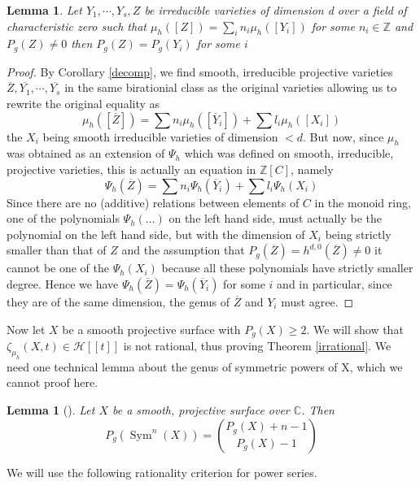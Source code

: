 \documentclass[11pt, a4paper, german]{article}
\theoremstyle{plain}
\newtheorem{lemma}[theorem]{Lemma}
\theoremstyle{definition}
\DeclareMathOperator{\Sym}{Sym}
\begin{document}
\begin{lemma}
    \label{same}
    Let $Y_1,\cdots,Y_s,Z$ be irreducible varieties of dimension d over a field of characteristic zero 
    such that $\mu_h([Z]) = \sum_i n_i \mu_h([Y_i])$ for some $n_i \in \mathbb{Z}$ and $P_g(Z) \neq 0$ then $P_g(Z) = P_g(Y_i)$ for some $i$
\end{lemma}
\begin{proof}
    By Corollary \ref{decomp}, we find smooth, irreducible projective varieties $\overline{Z},\overline{Y_1},\cdots, \overline{Y_s}$ in the same
    birationial class as the original varieties allowing us to rewrite the original equality as 
    \[
        \mu_h([\overline{Z}]) = \sum n_i\mu_h([\overline{Y}_i]) + \sum l_i \mu_h([X_i])
    \]
    the $X_i$ being smooth irreducible varieties of dimension $<d$.
    But now, since $\mu_h$ was obtained as an extension of $\Psi_h$ which was defined on smooth, irreducible, projective varieties, this is
    actually an equation in $\mathbb{Z}[C]$, namely
    \[
        \Psi_h(\overline{Z}) = \sum n_i \Psi_h(\overline{Y}_i) + \sum l_i\Psi_h(X_i)
    \]
    Since there are no (additive) relations between elements of $C$ in the monoid ring, one of the polynomials $\Psi_h(\dots)$ on the 
    left hand side, must actually be the polynomial on the left hand side, but with the dimension of 
    $X_i$ being strictly smaller than that of $Z$ and the assumption that
    $P_g(\overline{Z}) = h^{d,0}(\overline{Z}) \neq 0$ it cannot be one of the $\Psi_h(X_i)$ because all these polynomials have strictly smaller
    degree. Hence we have $\Psi_h(\overline{Z}) = \Psi_h(\overline{Y}_i)$ for some $i$ and in particular, since they are of the same dimension, the genus of
    $\overline{Z}$ and $Y_i$ must agree.
\end{proof}

Now let $X$ be a smooth projective surface with $P_g(X) \geq 2$. We will show that $\zeta_{\mu_h}(X,t) \in \mathcal{H}[[t]]$ is not rational,
thus proving Theorem \ref{irrational}. We need one technical lemma about the genus of symmetric powers of X, which we cannot proof here.

\begin{lemma}[{\cite[Lem. 3.8]{MR1996804}}]
    \label{genus}
    Let $X$ be a smooth, projective surface over $\mathbb{C}$. Then
    \[
        P_g(\Sym^n(X)) = \binom{P_g(X) + n - 1}{P_g(X) - 1}
    \]
\end{lemma}

We will use the following rationality criterion for power series.
\end{document}
